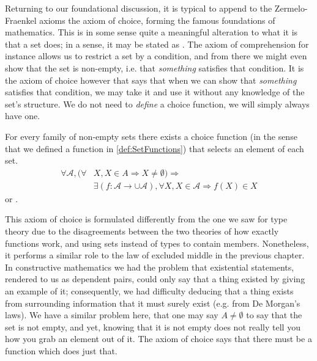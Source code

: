 \documentclass[11pt]{article}
\begin{document}
Returning to our foundational discussion, it is typical to append to the Zermelo-Fraenkel axioms the axiom of choice, forming the famous  foundations of mathematics. This is in some sense quite a meaningful alteration to what it is that a set does; in a sense, it may be stated as . The axiom of comprehension for instance allows us to restrict a set by a condition, and from there we might even show that the set is non-empty, i.e. that \emph{something} satisfies that condition. It is the axiom of choice however that says that when we can show that \emph{something} satisfies that condition, we may take it and use it without any knowledge of the set's structure. We do not need to \emph{define} a choice function, we will simply always have one.

\begin{definition}
For every family of non-empty sets there exists a choice function (in the sense that we defined a function in \ref{def:SetFunctions}) that selects an element of each set. \begin{align*}
\forall \mathcal{A}, \big(\forall & X, X \in A \Rightarrow X \neq \emptyset \big) \Rightarrow \\
&\exists (f \colon \mathcal{A} \to \cup \mathcal{A}), \forall X, X \in \mathcal{A} \Rightarrow f(X) \in X 
\end{align*}
or .
\end{definition}

This axiom of choice is formulated differently from the one we saw for type theory due to the disagreements between the two theories of how exactly functions work, and using sets instead of types to contain members. Nonetheless, it performs a similar role to the law of excluded middle in the previous chapter. In constructive mathematics we had the problem that existential statements, rendered to us as dependent pairs, could only say that a thing existed by giving an example of it; consequently, we had difficulty deducing that a thing exists from surrounding information that it must surely exist (e.g.  from De Morgan's laws). We have a similar problem here, that one may say $A \neq \emptyset$ to say that the set is not empty, and yet, knowing that it is not empty does not really tell you how you grab an element out of it. The axiom of choice says that there must be a function which does just that.
\end{document}
